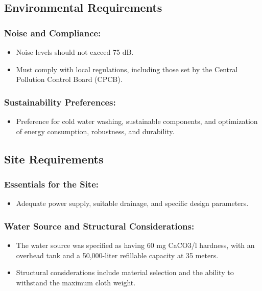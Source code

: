 \documentclass[table]{rapportCS}
\begin{document}
\subsection{ Environmental Requirements}\label{subsec:envireq}
\subsubsection{ Noise and Compliance:}\label{sec:noisecomp}
    \begin{itemize}[label=$\bullet$]
      \item Noise levels should not exceed 75 dB.
      \item Must comply with local regulations, including those set by the Central Pollution Control Board (CPCB).
    \end{itemize}
  
  \subsubsection{Sustainability Preferences:}\label{sec:suspref}
    \begin{itemize}[label=$\bullet$]
      \item Preference for cold water washing, sustainable components, and optimization of energy consumption, robustness, and durability.
    \end{itemize}

\subsection{Site Requirements}\label{sec:sitereq}
\subsubsection{Essentials for the Site:}\label{sec:essenforsite}
    \begin{itemize}[label=$\bullet$]
      \item Adequate power supply, suitable drainage, and specific design parameters.
    \end{itemize}
  
 \subsubsection{Water Source and Structural Considerations:}\label{sec:watersource}
    \begin{itemize}[label=$\bullet$]
      \item The water source was specified as having 60 mg CaCO3/l hardness, with an overhead tank and a 50,000-liter refillable capacity at 35 meters.
      \item Structural considerations include material selection and the ability to withstand the maximum cloth weight.
    \end{itemize}
\end{document}
